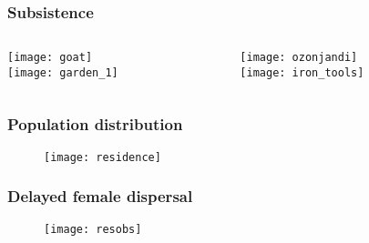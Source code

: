 \documentclass{beamer}
\begin{document}





\begin{frame}
\frametitle{Subsistence}

\begin{columns}
\begin{column}{.5\textwidth}
\centering
\texttt{[image: goat]}\\
\texttt{[image: garden\_1]}
\end{column}

\begin{column}{.5\textwidth}
\centering
\texttt{[image: ozonjandi]}\\
\texttt{[image: iron\_tools]}
\end{column}
\end{columns}

\end{frame}


\begin{frame}
\frametitle{Population distribution}
\begin{figure}
\texttt{[image: residence]}
\end{figure}
\end{frame}


\begin{frame}
\frametitle{Delayed female dispersal}
\begin{figure}
\texttt{[image: resobs]}
\end{figure}
\end{frame}

\end{document}
